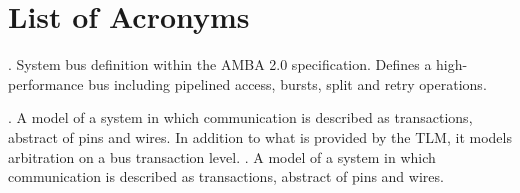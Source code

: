 
\chapter*{List of Acronyms}

\begin{acronym}
.
	System bus definition within the AMBA 2.0 specification. Defines a high-performance bus including pipelined access, bursts, split and retry operations.

.
  A model of a system in which communication is described as transactions, abstract of pins and wires.
  In addition to what is provided by the \acs{TLM}, it models arbitration on a bus transaction level.
.
  A model of a system in which communication is described as transactions, abstract of pins and wires.


\end{acronym}
